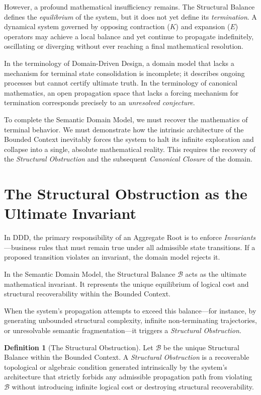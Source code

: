 \documentclass[12pt,openany]{extbook}
\theoremstyle{plain}
\theoremstyle{definition}
\newtheorem{definition}{Definition}[chapter]
\begin{document}
However, a profound mathematical insufficiency remains. The Structural Balance defines the \emph{equilibrium} of the system, but it does not yet define its \emph{termination}. A dynamical system governed by opposing contraction ($K$) and expansion ($E$) operators may achieve a local balance and yet continue to propagate indefinitely, oscillating or diverging without ever reaching a final mathematical resolution. 

In the terminology of Domain-Driven Design, a domain model that lacks a mechanism for terminal state consolidation is incomplete; it describes ongoing processes but cannot certify ultimate truth. In the terminology of canonical mathematics, an open propagation space that lacks a forcing mechanism for termination corresponds precisely to an \emph{unresolved conjecture}. 

To complete the Semantic Domain Model, we must recover the mathematics of terminal behavior. We must demonstrate how the intrinsic architecture of the Bounded Context inevitably forces the system to halt its infinite exploration and collapse into a single, absolute mathematical reality. This requires the recovery of the \emph{Structural Obstruction} and the subsequent \emph{Canonical Closure} of the domain.

\section{The Structural Obstruction as the Ultimate Invariant}

In DDD, the primary responsibility of an Aggregate Root is to enforce \emph{Invariants}---business rules that must remain true under all admissible state transitions. If a proposed transition violates an invariant, the domain model rejects it.

In the Semantic Domain Model, the Structural Balance $\mathcal{B}$ acts as the ultimate mathematical invariant. It represents the unique equilibrium of logical cost and structural recoverability within the Bounded Context. 

When the system's propagation attempts to exceed this balance---for instance, by generating unbounded structural complexity, infinite non-terminating trajectories, or unresolvable semantic fragmentation---it triggers a \emph{Structural Obstruction}.

\begin{definition}[The Structural Obstruction]
Let $\mathcal{B}$ be the unique Structural Balance within the Bounded Context. A \emph{Structural Obstruction} is a recoverable topological or algebraic condition generated intrinsically by the system's architecture that strictly forbids any admissible propagation path from violating $\mathcal{B}$ without introducing infinite logical cost or destroying structural recoverability.
\end{definition}
\end{document}
